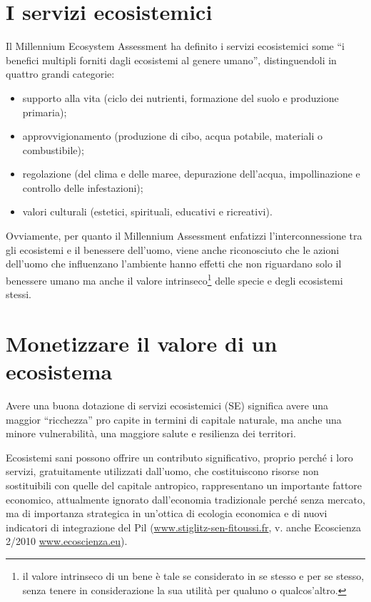 \documentclass[12pt,a4paper]{article}
\begin{document}
	\section{I servizi ecosistemici}
		Il Millennium Ecosystem Assessment\cite{MEA_EcosystemsAndHumanWellBeing:Synthesis} ha definito i servizi ecosistemici some ``i benefici multipli forniti dagli ecosistemi al genere umano'', distinguendoli in quattro grandi categorie:
		\begin{itemize}
			\item supporto alla vita (ciclo dei nutrienti, formazione del suolo e produzione primaria);
			\item approvvigionamento (produzione di cibo, acqua potabile, materiali o combustibile);
			\item regolazione (del clima e delle maree, depurazione dell'acqua, impollinazione e controllo delle infestazioni);
			\item valori culturali (estetici, spirituali, educativi e ricreativi).
		\end{itemize}
		Ovviamente, per quanto il Millennium Assessment enfatizzi l'interconnessione tra gli ecosistemi e il benessere dell'uomo, viene anche riconosciuto che le azioni dell'uomo che influenzano l'ambiente hanno effetti che non riguardano solo il benessere umano ma anche il valore intrinseco\footnote{ il valore intrinseco di un bene è tale se considerato in se stesso e per se stesso, senza tenere in considerazione la sua utilità per qualuno o qualcos'altro.	} delle specie e degli ecosistemi stessi.
	
	\section{Monetizzare il valore di un ecosistema\cite{SE_e_Sostenibilita}}

	Avere una buona dotazione di servizi ecosistemici (SE) significa avere una maggior ``ricchezza'' pro capite in termini di capitale naturale, ma anche una minore  vulnerabilità, una maggiore salute e resilienza dei territori.
	
	Ecosistemi sani possono offrire un contributo significativo, proprio perché i loro servizi, gratuitamente utilizzati dall'uomo, che costituiscono risorse non sostituibili con quelle del capitale antropico, rappresentano un importante fattore economico, attualmente ignorato dall'economia tradizionale perché senza mercato, ma di importanza strategica in un'ottica di ecologia economica e di nuovi indicatori di integrazione del Pil (\url{www.stiglitz-sen-fitoussi.fr}, v. anche Ecoscienza 2/2010 \url{www.ecoscienza.eu}).
	
\end{document}
